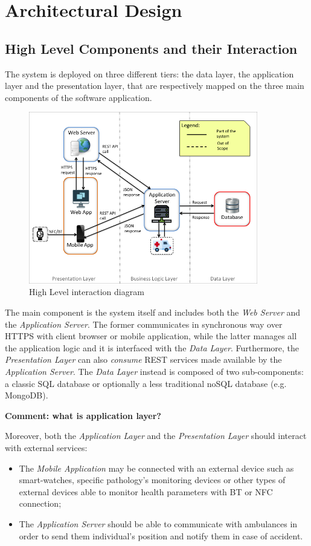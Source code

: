 \documentclass[a4paper]{article}
\newcommand{\comment}[1]{\textbf{Comment: #1}}
\begin{document}
\newpage
\section{Architectural Design}
\subsection{High Level Components and their Interaction}
The system is deployed on three different tiers: the data layer, the application layer and the presentation layer, that are respectively mapped on the three main components of the software application.
\begin{figure}[!htpb]
    	\centering
    	\includegraphics[width=100mm,keepaspectratio]{images/highlevel.png}
    	\caption{High Level interaction diagram}
\end{figure}

The main component is the system itself and includes both the \textit{Web Server} and the \textit{Application Server}. The former communicates in synchronous way over HTTPS with client browser or mobile application, while the latter manages all the application logic and it is interfaced with the \textit{Data Layer}. Furthermore, the \textit{Presentation Layer} can also \textit{consume} REST services made available by the \textit{Application Server}. The \textit{Data Layer} instead is composed of two sub-components: a classic SQL database or optionally a less traditional noSQL database (e.g. MongoDB).

\comment{what is application layer?}

Moreover, both the \textit{Application Layer} and the \textit{Presentation Layer} should interact with external services:
\begin{itemize}
    \item The \textit{Mobile Application} may be connected with an external device such as smart-watches, specific pathology's monitoring devices or other types of external devices able to monitor health parameters with BT or NFC connection;
    \item The \textit{Application Server} should be able to communicate with ambulances in order to send them individual's position and notify them in case of accident.
\end{itemize}
\end{document}
